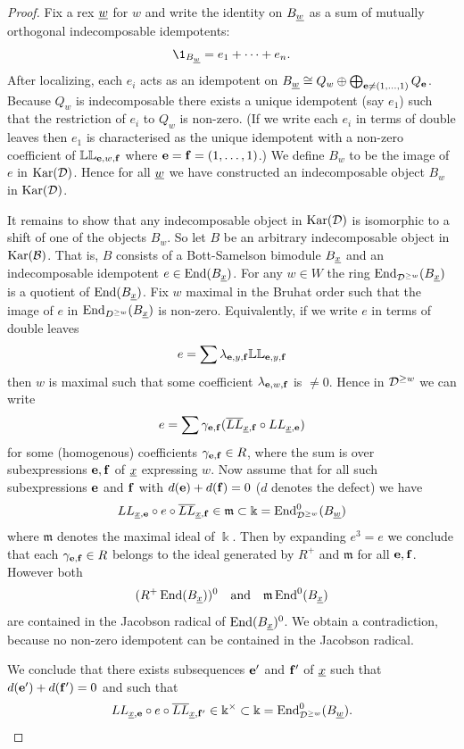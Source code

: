 \begin{proof}
  Fix a rex $\underline{w}$ for $w$ and write the identity on $B_{\underline{w}}$ as a sum of mutually orthogonal indecomposable idempotents:
\[
\1_{B_{\un{w}}} = e_1 + \dots + e_n.
\]
After localizing, each $e_i$ acts as an idempotent on $B_{\underline{w}} \cong Q_w \oplus \bigoplus_{{\mathbf e} \ne (1, \dots, 1)} Q_{{\mathbf e}}$. Because $Q_w$ is indecomposable there exists a unique idempotent (say $e_1$) such that the restriction of $e_i$ to $Q_w$ is non-zero. (If we write each $e_i$ in terms of double leaves then $e_1$ is characterised as the unique idempotent with a non-zero coefficient of $\mathbb{LL}_{{\mathbf e}, w, {\mathbf f}}$ where ${\mathbf e} = {\mathbf f} = (1, \dots, 1)$.) We define $B_w$ to be the image of $e$ in $\textrm{Kar}({\mathcal{D}})$. Hence for all $\underline{w}$ we have constructed an indecomposable object $B_w$ in $\textrm{Kar}({\mathcal{D}})$.

It remains to show that any indecomposable object in $\textrm{Kar}({\mathcal{D}})$ is isomorphic to a shift of one of the objects $B_w$. So let $B$ be an arbitrary indecomposable object in $\textrm{Kar}({\mathcal{B}})$. That is, $B$ consists of a Bott-Samelson bimodule $B_{\underline{x}}$ and an indecomposable idempotent $e \in \operatorname{End}(B_{\underline{x}})$. For any $w \in W$ the ring $\operatorname{End}_{{\mathcal{D}}^{\ge w}}(B_{\underline{x}})$ is a quotient of $\operatorname{End}(B_{\underline{x}})$. Fix $w$ maximal in the Bruhat order such that the image of $e$ in $\operatorname{End}_{D^{\ge w}}(B_{\underline{x}})$ is non-zero. Equivalently, if we write $e$ in terms of double leaves
\[
e = \sum \lambda_{{\mathbf e},y,{\mathbf f}} \mathbb{LL}_{{\mathbf e}, y, {\mathbf f}}
\]
then $w$ is maximal such that some coefficient $\lambda_{{\mathbf e},w,{\mathbf f}}$ is $\ne 0$. Hence in ${\mathcal{D}}^{\ge w}$ we can write
\[
e = \sum \gamma_{{\mathbf e}, {\mathbf f}} (\overline{LL}_{{\underline{x}},{\mathbf f}} \circ LL_{\underline{x},{\mathbf e}})
\]
for some (homogenous) coefficients $\gamma_{{\mathbf e}, {\mathbf f}} \in R$, where the sum is over subexpressions ${\mathbf e}, {\mathbf f}$ of $\underline{x}$ expressing $w$. Now assume that for all such subexpressions ${\mathbf e}$ and ${\mathbf f}$ with $d({\mathbf e}) + d({\mathbf f}) = 0$ ($d$ denotes the defect) we have
\[
 LL_{\underline{x},{\mathbf e}} \circ e \circ \overline{LL}_{{\underline{x}},{\mathbf f}} \in \mathfrak{m} \subset \Bbbk = \operatorname{End}^0_{{\mathcal{D}}^{\ge w}}(B_{\underline{w}})
\]
where $\mathfrak{m}$ denotes the maximal ideal of $\Bbbk$. Then by expanding $e^3 = e$ we conclude that each $\gamma_{{\mathbf e}, {\mathbf f}} \in R$ belongs to the ideal generated by $R^+$ and $\mathfrak{m}$ for all ${\mathbf e}, {\mathbf f}$. However both
\[ (R^+\operatorname{End}(B_{\underline{x}}))^0 \quad \text{and} \quad \mathfrak{m} \operatorname{End}^0(B_{\underline{x}}) \]
are contained in the Jacobson radical of $\operatorname{End}(B_{\underline{x}})^0$. We obtain a contradiction, because no non-zero idempotent can be contained in the Jacobson radical.

We conclude that there exists subsequences ${\mathbf e}'$ and ${\mathbf f}'$ of $\underline{x}$ such that $d({\mathbf e}') + d({\mathbf f}') = 0$ and such that
\[
LL_{\underline{x},{\mathbf e}} \circ e \circ \overline{LL}_{{\underline{x}},{\mathbf f}'} \in \Bbbk^{\times} \subset \Bbbk = \operatorname{End}^0_{{\mathcal{D}}^{\ge w}}(B_{\underline{w}}).
\]


\end{proof}
